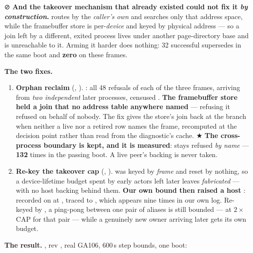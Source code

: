 \documentclass[10.5pt]{article}
\begin{document}
⊘ \textbf{And the takeover mechanism that already existed could not fix it \emph{by
construction}.}  routes by the \emph{caller's own}
 and searches only that address space, while the framebuffer store is
per-\emph{device} and keyed by physical address --- so a join left by a different, exited process
lives under another page-directory base and is unreachable to it. Arming it harder does nothing:
32 successful supersedes in the same boot and \textbf{zero} on these frames.

\textbf{The two fixes.}
\begin{enumerate}[itemsep=0.4ex]
\item \textbf{Orphan reclaim} (, ). \measured{} : all 48
  refusals of each of the three frames, arriving from \emph{two independent} later processes,
  censused . \textbf{The framebuffer store held a join that no address
  table anywhere named} --- refusing it refused on behalf of nobody. The fix gives the store's
  join back at the  branch when neither a live nor a retired row names the
  frame, recomputed at the decision point rather than read from the diagnostic's cache.
  ★ \textbf{The cross-process boundary is kept, and it is measured}:  stays refused
  \emph{by name} --- \textbf{132} times in the passing boot. A live peer's backing is never taken.
\item \textbf{Re-key the takeover cap} (, ).
   was keyed by \emph{frame} and reset by nothing, so a
  device-lifetime budget spent by early actors left later leaves \emph{fabricated} --- with no
  host backing behind them. \textbf{Our own bound then raised a host }: 
  recorded  on  at , traced to
  , which appears  nine times in our own log. Re-keyed by
  , a ping-pong between one pair of aliases is still bounded --- at
  $2\times$\,CAP for that pair --- while a genuinely new owner arriving later gets its own budget.
\end{enumerate}

\textbf{The result.} \measured{} , rev , real GA106, 600\,s step bounds,
one boot:
\end{document}

